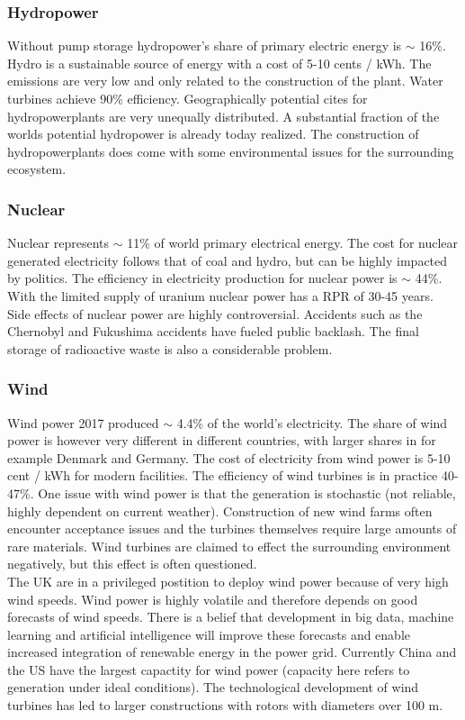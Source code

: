 \subsubsection{Hydropower}
Without pump storage hydropower's share of primary electric energy is $\sim$ 16\%.
Hydro is a sustainable source of energy with a cost of 5-10 cents / kWh.
The emissions are very low and only related to the construction of the plant.
Water turbines achieve 90\% efficiency.
Geographically potential cites for hydropowerplants are very unequally distributed.
A substantial fraction of the worlds potential hydropower is already today realized.
The construction of hydropowerplants does come with some environmental issues for the surrounding ecosystem.

\subsubsection{Nuclear}
Nuclear represents $\sim$ 11\% of world primary electrical energy. The cost for nuclear generated electricity follows that of coal and hydro, but can be highly impacted by politics.
The efficiency in electricity production for nuclear power is $\sim$ 44\%.
With the limited supply of uranium nuclear power has a RPR of 30-45 years.
Side effects of nuclear power are highly controversial. Accidents such as the Chernobyl and Fukushima accidents have fueled public backlash. The final storage of radioactive waste is also a considerable problem.

\subsubsection{Wind}
Wind power 2017 produced $\sim$ 4.4\% of the world's electricity.
The share of wind power is however very different in different countries, with larger shares in for example Denmark and Germany.
The cost of electricity from wind power is 5-10 cent / kWh for modern facilities.
The efficiency of wind turbines is in practice 40-47\%.
One issue with wind power is that the generation is stochastic (not reliable, highly dependent on current weather).
Construction of new wind farms often encounter acceptance issues and the turbines themselves require large amounts of rare materials.
Wind turbines are claimed to effect the surrounding environment negatively, but this effect is often questioned.\\

The UK are in a privileged postition to deploy wind power because of very high wind speeds.
Wind power is highly volatile and therefore depends on good forecasts of wind speeds.
There is a belief that development in big data, machine learning and artificial intelligence will improve these forecasts and enable increased integration of renewable energy in the power grid.
Currently China and the US have the largest capactity for wind power (capacity here refers to generation under ideal conditions).
The technological development of wind turbines has led to larger constructions with rotors with diameters over 100 m.

